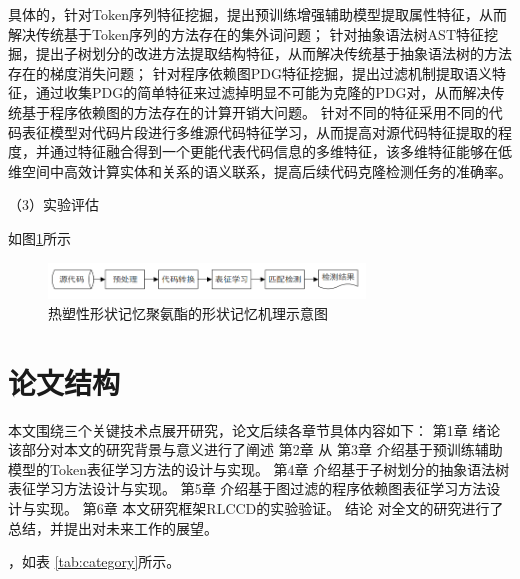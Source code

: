 具体的，针对Token序列特征挖掘，提出预训练增强辅助模型提取属性特征，从而解决传统基于Token序列的方法存在的集外词问题；
针对抽象语法树AST特征挖掘，提出子树划分的改进方法提取结构特征，从而解决传统基于抽象语法树的方法存在的梯度消失问题；
针对程序依赖图PDG特征挖掘，提出过滤机制提取语义特征，通过收集PDG的简单特征来过滤掉明显不可能为克隆的PDG对，从而解决传统基于程序依赖图的方法存在的计算开销大问题。
针对不同的特征采用不同的代码表征模型对代码片段进行多维源代码特征学习，从而提高对源代码特征提取的程度，并通过特征融合得到一个更能代表代码信息的多维特征，该多维特征能够在低维空间中高效计算实体和关系的语义联系，提高后续代码克隆检测任务的准确率。

（3）实验评估

如图\ref{fig:diagram}所示

\begin{figure}
 \centering
 \includegraphics[width=0.75\textwidth]{figures/figure1}
 \caption{热塑性形状记忆聚氨酯的形状记忆机理示意图}\label{fig:diagram}
\end{figure}


\section{论文结构}
本文围绕三个关键技术点展开研究，论文后续各章节具体内容如下：
第1章 绪论 该部分对本文的研究背景与意义进行了阐述 
第2章 从
第3章 介绍基于预训练辅助模型的Token表征学习方法的设计与实现。
第4章 介绍基于子树划分的抽象语法树表征学习方法设计与实现。
第5章 介绍基于图过滤的程序依赖图表征学习方法设计与实现。
第6章 本文研究框架RLCCD的实验验证。
结论 对全文的研究进行了总结，并提出对未来工作的展望。

\cite{Jiang2005Size} ，如表 \ref{tab:category}所示。
